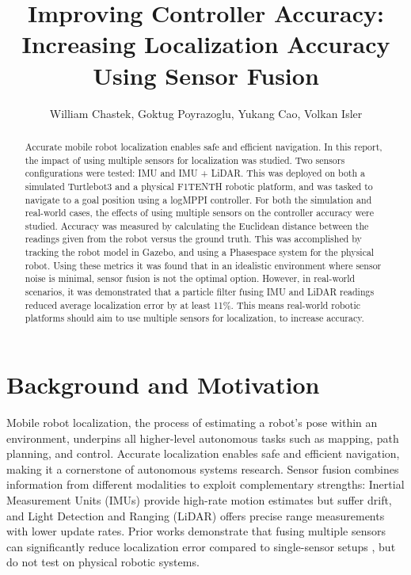 \documentclass[10.5pt]{article}
\title{Improving Controller Accuracy: Increasing Localization Accuracy Using Sensor Fusion}
\author{William Chastek, Goktug Poyrazoglu, Yukang Cao, Volkan Isler\\}
\begin{document}
\maketitle

\begin{abstract}
Accurate mobile robot localization enables safe and efficient navigation. In this report, the impact of using multiple sensors for localization was studied. Two sensors configurations were tested: IMU and IMU + LiDAR. This was deployed on both a simulated Turtlebot3 and a physical F1TENTH robotic platform, and was tasked to navigate to a goal position using a logMPPI controller. For both the simulation and real-world cases, the effects of using multiple sensors on the controller accuracy were studied. Accuracy was measured by calculating the Euclidean distance between the readings given from the robot versus the ground truth. This was accomplished by tracking the robot model in Gazebo, and using a Phasespace system for the physical robot. Using these metrics it was found that in an idealistic environment where sensor noise is minimal, sensor fusion is not the optimal option. However, in real-world scenarios, it was demonstrated that a particle filter fusing IMU and LiDAR readings reduced average localization error by at least 11\%. This means real-world robotic platforms should aim to use multiple sensors for localization, to increase accuracy.
\end{abstract}

\section{Background and Motivation}

Mobile robot localization, the process of estimating a robot’s pose within an environment, underpins all higher-level autonomous tasks such as mapping, path planning, and control. Accurate localization enables safe and efficient navigation, making it a cornerstone of autonomous systems research. Sensor fusion combines information from different modalities to exploit complementary strengths: Inertial Measurement Units (IMUs) provide high-rate motion estimates but suffer drift, and Light Detection and Ranging (LiDAR) offers precise range measurements with lower update rates. Prior works demonstrate that fusing multiple sensors can significantly reduce localization error compared to single-sensor setups \cite{Huang_Ye_Yang_Yu_2025}\cite{Cadena_2016}, but do not test on physical robotic systems.
\end{document}
